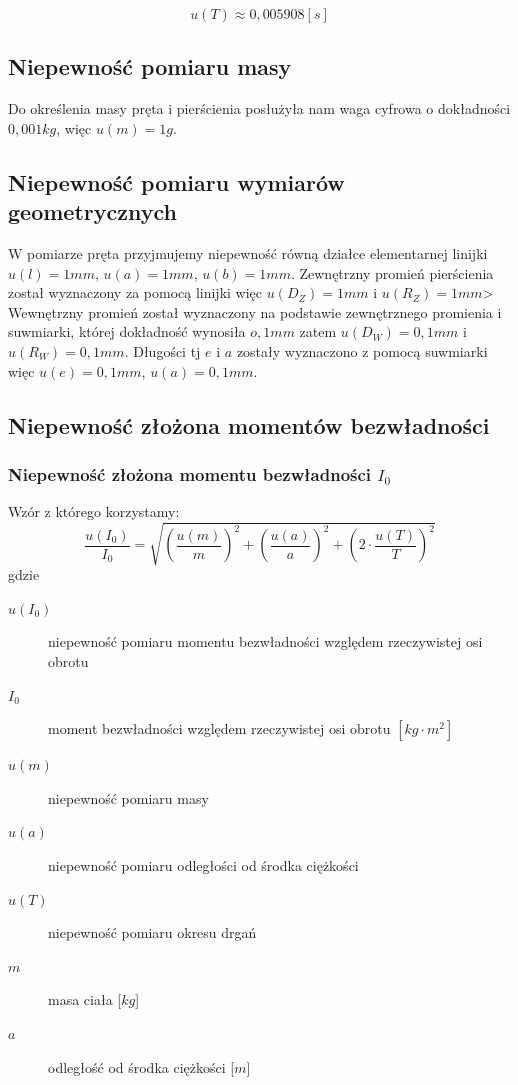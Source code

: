\documentclass[a4paper,11pt]{article}
\begin{document}
$$u(T) \approx 0,005908 [s]$$

\subsection{Niepewność pomiaru masy}
\indent Do określenia masy pręta i pierścienia posłużyła nam waga cyfrowa o dokładności $0,001kg$, więc $u(m)=1 g$.

\subsection{Niepewność pomiaru wymiarów geometrycznych}
\indent W pomiarze pręta przyjmujemy niepewność równą działce elementarnej linijki $u(l)=1mm$, $u(a)=1mm$, $u(b)=1mm$.
\indent Zewnętrzny promień pierścienia został wyznaczony za pomocą linijki więc  $u(D_{Z})= 1mm$ i $u(R_{Z})= 1mm$> Wewnętrzny promień został wyznaczony na podstawie zewnętrznego promienia i suwmiarki, której dokładność wynosiła $o,1mm$ zatem $u(D_{W})= 0,1mm$ i $u(R_{W})= 0,1mm$. Długości tj $e$ i $a$ zostały wyznaczono z pomocą suwmiarki więc $u(e)=0,1mm$, $u(a)=0,1mm$.

\subsection{Niepewność złożona momentów bezwładności}
\subsubsection{Niepewność złożona momentu bezwładności $I_{0}$}
Wzór z którego korzystamy:
\begin{equation}
\frac{u(I_{0})}{I_{0}}=\sqrt{\left (\frac{u(m)}{m}\right ) ^2+\left ( \frac{u(a)}{a}\right )^2+\left (2 \cdot \frac{u(T)}{T}\right )^2}
\end{equation}
gdzie
\begin{description}
\item [$u(I_{0})$] niepewność pomiaru momentu bezwładności względem rzeczywistej osi obrotu
\item [$I_{0}$] moment bezwładności względem rzeczywistej osi obrotu $\left[ kg \cdot m^{2} \right]$
\item [$u(m)$] niepewność pomiaru masy
\item [$u(a)$] niepewność pomiaru odległości od środka ciężkości
\item [$u(T)$] niepewność pomiaru okresu drgań
\item [$m$] masa ciała [$kg$]
\item [$a$] odległość od środka ciężkości [$m$]
\end{description}
\end{document}
